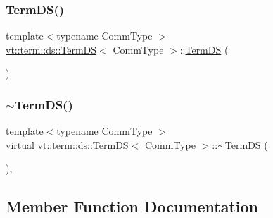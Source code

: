 \subsubsection{\texorpdfstring{Term\+D\+S()}{TermDS()}\hspace{0.1cm}{\footnotesize\ttfamily [3/3]}}
{\footnotesize\ttfamily template$<$typename Comm\+Type $>$ \\
\hyperlink{structvt_1_1term_1_1ds_1_1_term_d_s}{vt\+::term\+::ds\+::\+Term\+DS}$<$ Comm\+Type $>$\+::\hyperlink{structvt_1_1term_1_1ds_1_1_term_d_s}{Term\+DS} (\begin{DoxyParamCaption}\item[{\hyperlink{structvt_1_1term_1_1ds_1_1_term_d_s}{Term\+DS}$<$ Comm\+Type $>$ const \&}]{ }\end{DoxyParamCaption})\hspace{0.3cm}{\ttfamily [delete]}}

\mbox{\label{structvt_1_1term_1_1ds_1_1_term_d_s_ab7990eff9ce88551b3e2133f1664593a}} 
\subsubsection{\texorpdfstring{$\sim$\+Term\+D\+S()}{~TermDS()}}
{\footnotesize\ttfamily template$<$typename Comm\+Type $>$ \\
virtual \hyperlink{structvt_1_1term_1_1ds_1_1_term_d_s}{vt\+::term\+::ds\+::\+Term\+DS}$<$ Comm\+Type $>$\+::$\sim$\hyperlink{structvt_1_1term_1_1ds_1_1_term_d_s}{Term\+DS} (\begin{DoxyParamCaption}{ }\end{DoxyParamCaption})\hspace{0.3cm}{\ttfamily [virtual]}, {\ttfamily [default]}}



\subsection{Member Function Documentation}
\mbox{\label{structvt_1_1term_1_1ds_1_1_term_d_s_a7f77705496eed386505e5bd266fc9800}} 
